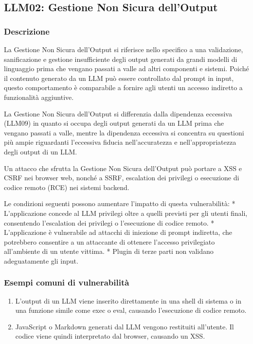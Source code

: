 \documentclass[
]{article}
\author{}
\date{}
\providecommand{\tightlist}{%
  \setlength{\itemsep}{0pt}\setlength{\parskip}{0pt}}
\begin{document}
\subsection{LLM02: Gestione Non Sicura
dell'Output}\label{llm02-gestione-non-sicura-delloutput}

\subsubsection{Descrizione}\label{descrizione}

La Gestione Non Sicura dell'Output si riferisce nello specifico a una
validazione, sanificazione e gestione insufficiente degli output
generati da grandi modelli di linguaggio prima che vengano passati a
valle ad altri componenti e sistemi. Poiché il contenuto generato da un
LLM può essere controllato dal prompt in input, questo comportamento è
comparabile a fornire agli utenti un accesso indiretto a funzionalità
aggiuntive.

La Gestione Non Sicura dell'Output si differenzia dalla dipendenza
eccessiva (LLM09) in quanto si occupa degli output generati da un LLM
prima che vengano passati a valle, mentre la dipendenza eccessiva si
concentra su questioni più ampie riguardanti l'eccessiva fiducia
nell'accuratezza e nell'appropriatezza degli output di un LLM.

Un attacco che sfrutta la Gestione Non Sicura dell'Output può portare a
XSS e CSRF nei browser web, nonché a SSRF, escalation dei privilegi o
esecuzione di codice remoto (RCE) nei sistemi backend.

Le condizioni seguenti possono aumentare l'impatto di questa
vulnerabilità: * L'applicazione concede al LLM privilegi oltre a quelli
previsti per gli utenti finali, consentendo l'escalation dei privilegi o
l'esecuzione di codice remoto. * L'applicazione è vulnerabile ad
attacchi di iniezione di prompt indiretta, che potrebbero consentire a
un attaccante di ottenere l'accesso privilegiato all'ambiente di un
utente vittima. * Plugin di terze parti non validano adeguatamente gli
input.

\subsubsection{Esempi comuni di
vulnerabilità}\label{esempi-comuni-di-vulnerabilituxe0}

\begin{enumerate}
\def\labelenumi{\arabic{enumi}.}
\tightlist
\item
  L'output di un LLM viene inserito direttamente in una shell di sistema
  o in una funzione simile come exec o eval, causando l'esecuzione di
  codice remoto.
\item
  JavaScript o Markdown generati dal LLM vengono restituiti all'utente.
  Il codice viene quindi interpretato dal browser, causando un XSS.
\end{enumerate}
\end{document}
